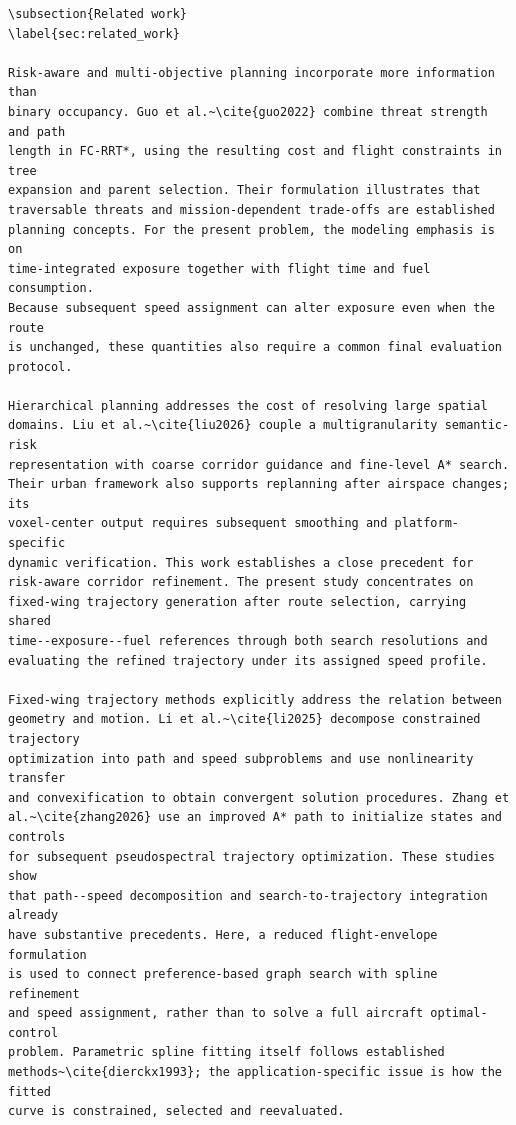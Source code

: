 \documentclass[12pt]{article}
\begin{document}
\begin{verbatim}
\subsection{Related work}
\label{sec:related_work}

Risk-aware and multi-objective planning incorporate more information than
binary occupancy. Guo et al.~\cite{guo2022} combine threat strength and path
length in FC-RRT*, using the resulting cost and flight constraints in tree
expansion and parent selection. Their formulation illustrates that
traversable threats and mission-dependent trade-offs are established
planning concepts. For the present problem, the modeling emphasis is on
time-integrated exposure together with flight time and fuel consumption.
Because subsequent speed assignment can alter exposure even when the route
is unchanged, these quantities also require a common final evaluation
protocol.

Hierarchical planning addresses the cost of resolving large spatial
domains. Liu et al.~\cite{liu2026} couple a multigranularity semantic-risk
representation with coarse corridor guidance and fine-level A* search.
Their urban framework also supports replanning after airspace changes; its
voxel-center output requires subsequent smoothing and platform-specific
dynamic verification. This work establishes a close precedent for
risk-aware corridor refinement. The present study concentrates on
fixed-wing trajectory generation after route selection, carrying shared
time--exposure--fuel references through both search resolutions and
evaluating the refined trajectory under its assigned speed profile.

Fixed-wing trajectory methods explicitly address the relation between
geometry and motion. Li et al.~\cite{li2025} decompose constrained trajectory
optimization into path and speed subproblems and use nonlinearity transfer
and convexification to obtain convergent solution procedures. Zhang et
al.~\cite{zhang2026} use an improved A* path to initialize states and controls
for subsequent pseudospectral trajectory optimization. These studies show
that path--speed decomposition and search-to-trajectory integration already
have substantive precedents. Here, a reduced flight-envelope formulation
is used to connect preference-based graph search with spline refinement
and speed assignment, rather than to solve a full aircraft optimal-control
problem. Parametric spline fitting itself follows established
methods~\cite{dierckx1993}; the application-specific issue is how the fitted
curve is constrained, selected and reevaluated.


\end{verbatim}
\end{document}
